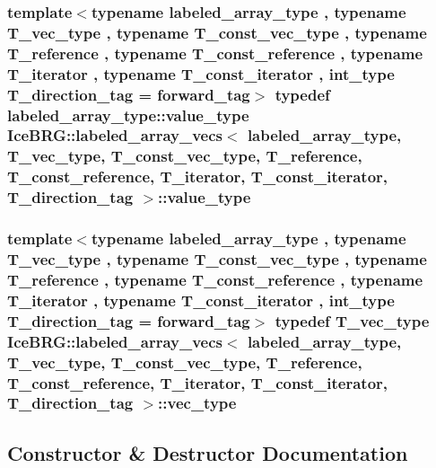\subsubsection[{value\+\_\+type}]{\setlength{\rightskip}{0pt plus 5cm}template$<$typename labeled\+\_\+array\+\_\+type , typename T\+\_\+vec\+\_\+type , typename T\+\_\+const\+\_\+vec\+\_\+type , typename T\+\_\+reference , typename T\+\_\+const\+\_\+reference , typename T\+\_\+iterator , typename T\+\_\+const\+\_\+iterator , int\+\_\+type T\+\_\+direction\+\_\+tag = forward\+\_\+tag$>$ typedef labeled\+\_\+array\+\_\+type\+::value\+\_\+type {\bf Ice\+B\+R\+G\+::labeled\+\_\+array\+\_\+vecs}$<$ labeled\+\_\+array\+\_\+type, T\+\_\+vec\+\_\+type, T\+\_\+const\+\_\+vec\+\_\+type, T\+\_\+reference, T\+\_\+const\+\_\+reference, T\+\_\+iterator, T\+\_\+const\+\_\+iterator, T\+\_\+direction\+\_\+tag $>$\+::{\bf value\+\_\+type}}\label{classIceBRG_1_1labeled__array__vecs_ac065b9242f4296223c4415479ca5f5c6}
\hypertarget{classIceBRG_1_1labeled__array__vecs_aa0fdd516085cd0ab638b05ff66cae352}{}
\subsubsection[{vec\+\_\+type}]{\setlength{\rightskip}{0pt plus 5cm}template$<$typename labeled\+\_\+array\+\_\+type , typename T\+\_\+vec\+\_\+type , typename T\+\_\+const\+\_\+vec\+\_\+type , typename T\+\_\+reference , typename T\+\_\+const\+\_\+reference , typename T\+\_\+iterator , typename T\+\_\+const\+\_\+iterator , int\+\_\+type T\+\_\+direction\+\_\+tag = forward\+\_\+tag$>$ typedef T\+\_\+vec\+\_\+type {\bf Ice\+B\+R\+G\+::labeled\+\_\+array\+\_\+vecs}$<$ labeled\+\_\+array\+\_\+type, T\+\_\+vec\+\_\+type, T\+\_\+const\+\_\+vec\+\_\+type, T\+\_\+reference, T\+\_\+const\+\_\+reference, T\+\_\+iterator, T\+\_\+const\+\_\+iterator, T\+\_\+direction\+\_\+tag $>$\+::{\bf vec\+\_\+type}}\label{classIceBRG_1_1labeled__array__vecs_aa0fdd516085cd0ab638b05ff66cae352}


\subsection{Constructor \& Destructor Documentation}
\hypertarget{classIceBRG_1_1labeled__array__vecs_a67951d0908cdc5b4b2dea5f56cbed4b8}{}
